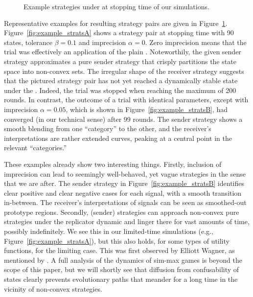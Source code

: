 \documentclass[fleqn,reqno,10pt]{article}
\newcommand{\rd}{\acro{rd}} %
\newcommand{\rdd}{\acro{rdd}} %
\newcommand{\imprecision}{\ensuremath{\alpha}} %
\newcommand{\toler}{\ensuremath{\beta}} %
\newcommand{\ns}{\ensuremath{n_s}} %
\begin{document}
\begin{figure}


  \caption{Example strategies under \rdd at stopping time of our simulations.}
  \label{fig:example_strats}
\end{figure}

Representative examples for resulting strategy pairs are given in
Figure~\ref{fig:example_strats}. Figure~\ref{fig:example_stratsA} shows a strategy pair at
stopping time with 90 states, tolerance $\toler = 0.1$ and imprecision $\imprecision = 0$. Zero
imprecision means that the trial was effectively an application of the plain \rd. Noteworthily,
the given sender strategy approximates a pure sender strategy that crisply partitions the state
space into non-convex sets. The irregular shape of the receiver strategy suggests that the
pictured strategy pair has not yet reached a dynamically stable state under the \rd. Indeed,
the trial was stopped when reaching the maximum of 200 rounds. In contrast, the outcome of a
trial with identical parameters, except with imprecision $\imprecision = 0.05$, which is shown
in Figure~\ref{fig:example_stratsB}, had converged (in our technical sense) after 99
rounds. The sender strategy shows a smooth blending from one ``category'' to the other, and the
receiver's interpretations are rather extended curves, peaking at a central point in the
relevant ``categories.''

These examples already show two interesting things. Firstly, inclusion of imprecision can lead
to seemingly well-behaved, yet vague strategies in the sense that we are after. The sender
strategy in Figure~\ref{fig:example_stratsB} identifies clear positive and clear negative cases
for each signal, with a smooth transition in-between. The receiver's interpretations of signals
can be seen as smoothed-out prototype regions. Secondly, (sender) strategies can approach
non-convex pure strategies under the replicator dynamic and linger there for vast amounts of
time, possibly indefinitely. We see this in our limited-time simulations (e.g.,
Figure~\ref{fig:example_stratsA}), but this also holds, for some types of utility functions,
for the limiting case. This was first observed by Elliott Wagner, as mentioned by
\citet{OConnor2014-OCOEPC}.  A full analysis of the dynamics of sim-max games is beyond the
scope of this paper, but we will shortly see that diffusion from confusability of states
clearly prevents evolutionary paths that meander for a long time in the vicinity of non-convex
strategies.
\end{document}
